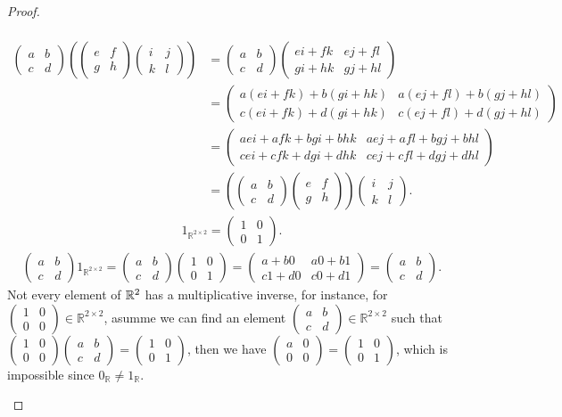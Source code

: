\documentclass{amsart}
\newcommand{\bbr}{\mathbb{R}}
\newcommand{\aaa}{\left(\begin{smallmatrix}a&b\\c&d\end{smallmatrix}\right)}
\newcommand{\bbb}{\left(\begin{smallmatrix}e&f\\g&h\end{smallmatrix}\right)}
\newcommand{\ccc}{\left(\begin{smallmatrix}i&j\\k&l\end{smallmatrix}\right)}
\theoremstyle{plain}
\theoremstyle{definition}
\begin{document}
\begin{proof}
\begin{enumerate}[(a)]
\begin{align*}
			\end{align*}
			\begin{align*}
			\aaa\left(\bbb\ccc\right) &= \aaa \left(\begin{smallmatrix}ei+fk&ej+fl\\gi+hk&gj+hl\end{smallmatrix}\right) \\ &= \left(\begin{smallmatrix}a(ei+fk)+b(gi+hk)&a(ej+fl)+b(gj+hl)\\c(ei+fk)+d(gi+hk)&c(ej+fl)+d(gj+hl)\end{smallmatrix}\right) \\ &= \left(\begin{smallmatrix}aei+afk+bgi+bhk&aej+afl+bgj+bhl\\cei+cfk+dgi+dhk&cej+cfl+dgj+dhl\end{smallmatrix}\right) \\ &= \left(\aaa\bbb\right)\ccc.
			\end{align*}
			\begin{align*}
            1_{\bbr^{2\times 2}} = \left(\begin{smallmatrix}1&0\\0&1\end{smallmatrix}\right).
			\end{align*}
			\begin{align*}
			\aaa 1_{\bbr^{2\times 2}} =\aaa \left(\begin{smallmatrix}1&0\\0&1\end{smallmatrix}\right) =  \left(\begin{smallmatrix}a+b0&a0+b1\\c1+d0&c0+d1\end{smallmatrix}\right)=\aaa.
			\end{align*}
			Not every element of $\bbr^{2\time2}$ has a multiplicative inverse, for instance,
		for $\left(\begin{smallmatrix}1&0\\0&0\end{smallmatrix}\right) \in \bbr^{2\times 2}$, asumme we can find an element $\aaa \in \bbr^{2\times 2}$ such that $\left(\begin{smallmatrix}1&0\\0&0\end{smallmatrix}\right) \aaa = \left(\begin{smallmatrix}1&0\\0&1\end{smallmatrix}\right)$, then we have $\left(\begin{smallmatrix}a&0\\0&0\end{smallmatrix}\right) = \left(\begin{smallmatrix}1&0\\0&1\end{smallmatrix}\right)$, which is impossible since $0_{\bbr} \neq 1_{\bbr} $.

\end{enumerate}
\end{proof}
\end{document}

